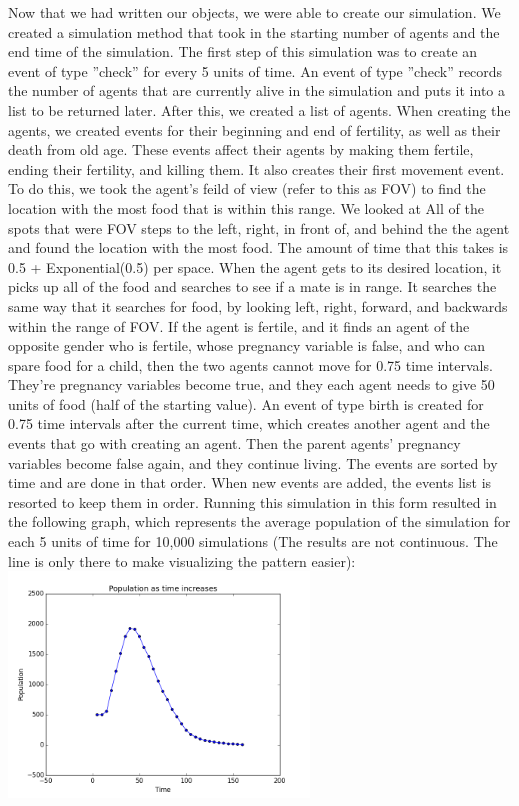 \documentclass[11pt]{article}
\begin{document}
\begin{multicols}{2}
Now that we had written our objects, we were able to create our simulation. We created a simulation method that took in the starting number of agents and the end time of the simulation. The first step of this simulation was to create an event of type ''check'' for every 5 units of time. An event of type ''check'' records the number of agents that are currently alive in the simulation and puts it into a list to be returned later. \newline
After this, we created a list of agents. When creating the agents, we created events for their beginning and end of fertility, as well as their death from old age. These events affect their agents by making them fertile, ending their fertility, and killing them.
\newline
It also creates their first movement event. To do this, we took the agent's feild of view (refer to this as FOV) to find the location with the most food that is within this range. We looked at All of the spots that were FOV steps to the left, right, in front of, and behind the the agent and found the location with the most food. The amount of time that this takes is 0.5 + Exponential(0.5) per space. When the agent gets to its desired location, it picks up all of the food and searches to see if a mate is in range. It searches the same way that it searches for food, by looking left, right, forward, and backwards within the range of FOV. If the agent is fertile, and it finds an agent of the opposite gender who is fertile, whose pregnancy variable is false, and who can spare food for a child, then the two agents cannot move for 0.75 time intervals. They're pregnancy variables become true, and they each agent needs to give 50 units of food (half of the starting value). An event of type birth is created for 0.75 time intervals after the current time, which creates another agent and the events that go with creating an agent. Then the parent agents' pregnancy variables become false again, and they continue living. \newline
The events are sorted by time and are done in that order. When new events are added, the events list is resorted to keep them in order.
\newline
Running this simulation in this form resulted in the following graph, which represents the average population of the simulation for each 5 units of time for 10,000 simulations (The results are not continuous. The line is only there to make visualizing the pattern easier):\newline
\includegraphics[width=80mm]{Population500.png} \newline

\end{multicols}
\end{document}
